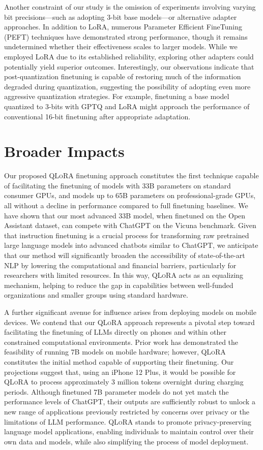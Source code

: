 Another constraint of our study is the omission of experiments involving varying bit precisions—such as adopting 3-bit base models—or alternative adapter approaches. In addition to LoRA, numerous Parameter Efficient FineTuning (PEFT) techniques have demonstrated strong performance, though it remains undetermined whether their effectiveness scales to larger models. While we employed LoRA due to its established reliability, exploring other adapters could potentially yield superior outcomes. Interestingly, our observations indicate that post-quantization finetuning is capable of restoring much of the information degraded during quantization, suggesting the possibility of adopting even more aggressive quantization strategies. For example, finetuning a base model quantized to 3-bits with GPTQ and LoRA might approach the performance of conventional 16-bit finetuning after appropriate adaptation.

\section{Broader Impacts}

Our proposed \textsc{QLoRA} finetuning approach constitutes the first technique capable of facilitating the finetuning of models with 33B parameters on standard consumer GPUs, and models up to 65B parameters on professional-grade GPUs, all without a decline in performance compared to full finetuning baselines. We have shown that our most advanced 33B model, when finetuned on the Open Assistant dataset, can compete with ChatGPT on the Vicuna benchmark. Given that instruction finetuning is a crucial process for transforming raw pretrained large language models into advanced chatbots similar to ChatGPT, we anticipate that our method will significantly broaden the accessibility of state-of-the-art NLP by lowering the computational and financial barriers, particularly for researchers with limited resources. In this way, \textsc{QLoRA} acts as an equalizing mechanism, helping to reduce the gap in capabilities between well-funded organizations and smaller groups using standard hardware.

A further significant avenue for influence arises from deploying models on mobile devices. We contend that our \textsc{QLoRA} approach represents a pivotal step toward facilitating the finetuning of LLMs directly on phones and within other constrained computational environments. Prior work has demonstrated the feasibility of running 7B models on mobile hardware; however, \textsc{QLoRA} constitutes the initial method capable of supporting their finetuning. Our projections suggest that, using an iPhone 12 Plus, it would be possible for \textsc{QLoRA} to process approximately 3 million tokens overnight during charging periods. Although finetuned 7B parameter models do not yet match the performance levels of ChatGPT, their outputs are sufficiently robust to unlock a new range of applications previously restricted by concerns over privacy or the limitations of LLM performance. \textsc{QLoRA} stands to promote privacy-preserving language model applications, enabling individuals to maintain control over their own data and models, while also simplifying the process of model deployment.

